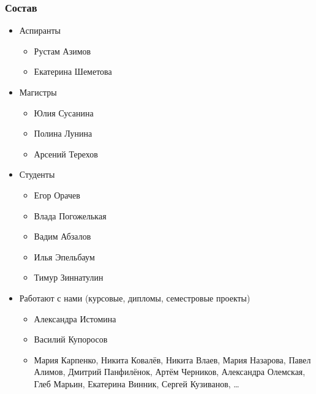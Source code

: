 \documentclass[xcolor=table]{beamer}
\begin{document}
\begin{frame}[fragile]

  \frametitle{Состав}
\begin{itemize}
      \item Аспиранты
      \begin{itemize}
        \item Рустам Азимов
        \item Екатерина Шеметова
      \end{itemize}
      \item Магистры
      \begin{itemize}
        \item Юлия Сусанина
        \item Полина Лунина
        \item Арсений Терехов
      \end{itemize}
      \item Студенты
      \begin{itemize}
        \item Егор Орачев
        \item Влада Погожелькая
        \item Вадим Абзалов
        \item Илья Эпельбаум
        \item Тимур Зиннатулин
      \end{itemize}
      \item Работают с нами (курсовые, дипломы, семестровые проекты)
      \begin{itemize}
        \item Александра Истомина
        \item Василий Купоросов
        \item Мария Карпенко, Никита Ковалёв, Никита Влаев, Мария Назарова, Павел Алимов, \small {Дмитрий Панфилёнок, Артём Черников, \footnotesize{Александра Олемская, Глеб Марьин, Екатерина Винник, Сергей Кузиванов, \dots}}
      \end{itemize}

\end{itemize}

\end{frame}
\end{document}
